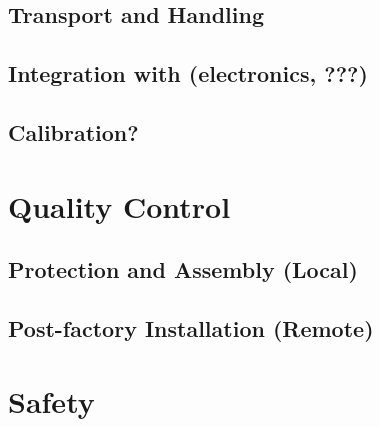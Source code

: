 \subsection{Transport and Handling}
\label{sec:fdsp-daq-install-transport}


\subsection{Integration with (electronics, ???)}
\label{sec:fdsp-daq-install-pd-???}


\subsection{Calibration?}
\label{sec:fdsp-daq-install-calib}



\section{Quality Control}
\label{sec:fdsp-daq-qc}

\subsection{Protection and Assembly (Local)}
\label{sec:fdsp-daq-qc-local}


\subsection{Post-factory Installation (Remote)}
\label{sec:fdsp-daq-qc-remote}





\section{Safety}
\label{sec:fdsp-daq-safety}



